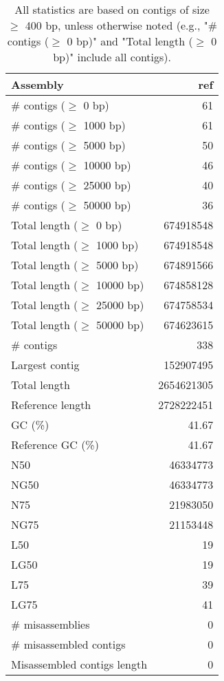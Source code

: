\documentclass[12pt,a4paper]{article}
\begin{document}
\begin{table}[ht]
\begin{center}
\caption{All statistics are based on contigs of size $\geq$ 400 bp, unless otherwise noted (e.g., "\# contigs ($\geq$ 0 bp)" and "Total length ($\geq$ 0 bp)" include all contigs).}
\begin{tabular}{|l*{1}{|r}|}
\hline
Assembly & ref \\ \hline
\# contigs ($\geq$ 0 bp) & 61 \\ \hline
\# contigs ($\geq$ 1000 bp) & 61 \\ \hline
\# contigs ($\geq$ 5000 bp) & 50 \\ \hline
\# contigs ($\geq$ 10000 bp) & 46 \\ \hline
\# contigs ($\geq$ 25000 bp) & 40 \\ \hline
\# contigs ($\geq$ 50000 bp) & 36 \\ \hline
Total length ($\geq$ 0 bp) & 674918548 \\ \hline
Total length ($\geq$ 1000 bp) & 674918548 \\ \hline
Total length ($\geq$ 5000 bp) & 674891566 \\ \hline
Total length ($\geq$ 10000 bp) & 674858128 \\ \hline
Total length ($\geq$ 25000 bp) & 674758534 \\ \hline
Total length ($\geq$ 50000 bp) & 674623615 \\ \hline
\# contigs & 338 \\ \hline
Largest contig & 152907495 \\ \hline
Total length & 2654621305 \\ \hline
Reference length & 2728222451 \\ \hline
GC (\%) & 41.67 \\ \hline
Reference GC (\%) & 41.67 \\ \hline
N50 & 46334773 \\ \hline
NG50 & 46334773 \\ \hline
N75 & 21983050 \\ \hline
NG75 & 21153448 \\ \hline
L50 & 19 \\ \hline
LG50 & 19 \\ \hline
L75 & 39 \\ \hline
LG75 & 41 \\ \hline
\# misassemblies & 0 \\ \hline
\# misassembled contigs & 0 \\ \hline
Misassembled contigs length & 0 \\ \hline

\end{tabular}
\end{center}
\end{table}
\end{document}
